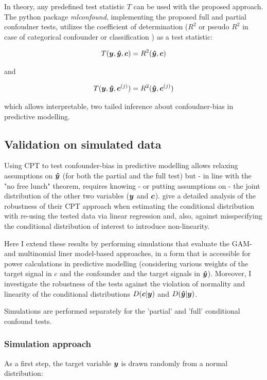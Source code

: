 \documentclass{article}
\begin{document}
In theory, any predefined test statistic $T$ can be used with the proposed approach. The python package \emph{mlconfound}, implementing the proposed full and partial confoudner tests, utilizes the coefficient of determination ($R^2$ or pseudo $R^2$ in case of categorical confounder or classification \citep{starkweather2011multinomial}) as a test statistic:

$$T(\boldsymbol{y}, \boldsymbol{\hat{y}}, \boldsymbol{c}) = R^2(\boldsymbol{\hat{y}}, \boldsymbol{c})$$ 

and

$$T(\boldsymbol{y}, \boldsymbol{\hat{y}}, \boldsymbol{c}^{(j)}) = R^2(\boldsymbol{\hat{y}}, \boldsymbol{c}^{(j)})$$ 

which allows interpretable, two tailed inference about confoudner-bias in predictive modelling.


\subsection{Validation on simulated data}

Using CPT to test confounder-bias in predictive modelling allows relaxing assumptions on $\boldsymbol{\hat{y}}$ (for both the partial and the full test) but - in line with the "no free lunch" theorem, requires knowing - or putting assumptions on - the joint distribution of the other two variables ($\boldsymbol{y}$ and $\boldsymbol{c}$). 
\cite{berrett2020conditional} give a detailed analysis of the robustness of their CPT approach when estimating the conditional distribution with re-using the tested data via linear regression and, also, against misspecifying the conditional distribution of interest to introduce non-linearity.

Here I extend these results by performing simulations that evaluate the GAM- and multinomial liner model-based approaches, in a form that is accessible for power calculations in predictive modelling (considering various weights of the target signal in $c$ and the confounder and the target signals in $\boldsymbol{\hat{y}}$).
Moreover, I investigate the robustness of the tests against the violation of normality and linearity of the conditional distributions $D(\boldsymbol{c}|\boldsymbol{y})$ and $D(\boldsymbol{\hat{y}}|\boldsymbol{y})$.

Simulations are performed separately for the 'partial' and 'full' conditional confound tests.

\subsubsection*{Simulation approach}
As  a first step, the target variable $\boldsymbol{y}$ is drawn randomly from a normal distribution:
\end{document}
